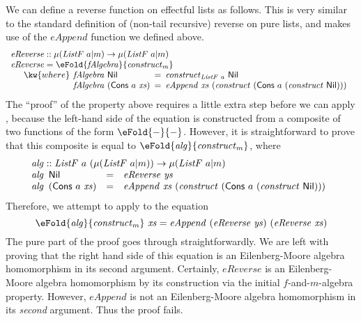 We can define a reverse function on effectful lists as follows. This
is very similar to the standard definition of (non-tail recursive)
reverse on pure lists, and makes use of the $\mathit{eAppend}$
function we defined above.
\begin{displaymath}
  \begin{array}{l}
    \mathit{eReverse} :: \mu(\mathit{ListF}~a|m) \to \mu(\mathit{ListF}~a|m) \\
    \mathit{eReverse} = \eFold{\mathit{fAlgebra}}{\mathit{construct}_m} \\
    \quad\begin{array}{r@{\hspace{0.4em}}l@{\hspace{0.5em}}c@{\hspace{0.5em}}l}
      \kw{where} & \mathit{fAlgebra}~\mathsf{Nil} &=& \mathit{construct}_{\mathit{ListF}~a}~\mathsf{Nil} \\
      & \mathit{fAlgebra}~(\mathsf{Cons}~a~\mathit{xs}) &=& \mathit{eAppend}~\mathit{xs}~(\mathit{construct}~(\mathsf{Cons}~a~(\mathit{construct}~\mathsf{Nil})))
    \end{array}
  \end{array}
\end{displaymath}
The ``proof'' of the property above requires a little extra step
before we can apply , because the
left-hand side of the equation is constructed from a composite of two
functions of the form $\eFold{-}{-}$. However, it is straightforward
to prove that this composite is equal to
$\eFold{\mathit{alg}}{\mathit{construct}_m}$, where
\begin{displaymath}
  \begin{array}{l}
    \mathit{alg} :: \mathit{ListF}~a~(\mu(\mathit{ListF}~a|m)) \to \mu(\mathit{ListF}~a|m) \\
    \begin{array}{@{}l@{\hspace{0.5em}}lcl}
      \mathit{alg}&\mathsf{Nil} &=& \mathit{eReverse}~\mathit{ys} \\
      \mathit{alg}&(\mathsf{Cons}~a~\mathit{xs}) & =& \mathit{eAppend}~\mathit{xs}~(\mathit{construct}~(\mathsf{Cons}~a~(\mathit{construct}~\mathsf{Nil})))
    \end{array}
  \end{array}
\end{displaymath}
Therefore, we attempt to apply  to the equation
\begin{displaymath}
  \eFold{\mathit{alg}}{\mathit{construct}_m}~\mathit{xs} = \mathit{eAppend}~(\mathit{eReverse}~\mathit{ys})~(\mathit{eReverse}~\mathit{xs})
\end{displaymath}
The pure part of the proof goes through straightforwardly. We are left
with proving that the right hand side of this equation is an
Eilenberg-Moore algebra homomorphism in its second
argument. Certainly, $\mathit{eReverse}$ is an Eilenberg-Moore algebra
homomorphism by its construction via the initial $f$-and-$m$-algebra
property. However, $\mathit{eAppend}$ is not an Eilenberg-Moore
algebra homomorphism in its \emph{second} argument. Thus the proof
fails.

